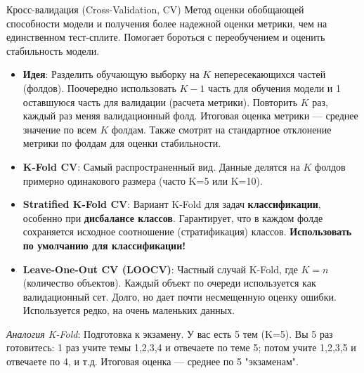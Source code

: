 \begin{myblock}{{Кросс-валидация (Cross-Validation, CV)}}
    Метод оценки обобщающей способности модели и получения более надежной оценки метрики, чем на единственном тест-сплите. Помогает бороться с переобучением и оценить стабильность модели.
    \begin{itemize}
        \item \textbf{Идея}: Разделить обучающую выборку на $K$ непересекающихся частей (фолдов). Поочередно использовать $K-1$ часть для обучения модели и 1 оставшуюся часть для валидации (расчета метрики). Повторить $K$ раз, каждый раз меняя валидационный фолд. Итоговая оценка метрики — среднее значение по всем $K$ фолдам. Также смотрят на стандартное отклонение метрики по фолдам для оценки стабильности.
        \item \textbf{K-Fold CV}: Самый распространенный вид. Данные делятся на $K$ фолдов примерно одинакового размера (часто K=5 или K=10).
        \item \textbf{Stratified K-Fold CV}: Вариант K-Fold для задач \textbf{классификации}, особенно при \textbf{дисбалансе классов}. Гарантирует, что в каждом фолде сохраняется исходное соотношение (стратификация) классов. \textbf{Использовать по умолчанию для классификации!}
        \item \textbf{Leave-One-Out CV (LOOCV)}: Частный случай K-Fold, где $K=n$ (количество объектов). Каждый объект по очереди используется как валидационный сет. Долго, но дает почти несмещенную оценку ошибки. Используется редко, на очень маленьких данных.
    \end{itemize}
    \textit{Аналогия K-Fold}: Подготовка к экзамену. У вас есть 5 тем (K=5). Вы 5 раз готовитесь: 1 раз учите темы 1,2,3,4 и отвечаете по теме 5; потом учите 1,2,3,5 и отвечаете по 4, и т.д. Итоговая оценка — среднее по 5 "экзаменам".
\end{myblock}

